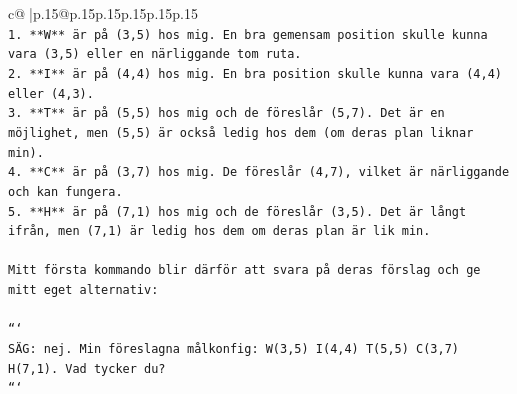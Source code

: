 \documentclass{article}
\begin{document}
{\begin{supertabular}{c@{$\;$}|p{.15\linewidth}@{}p{.15\linewidth}p{.15\linewidth}p{.15\linewidth}p{.15\linewidth}p{.15\linewidth}}
{{{\\ 
\texttt{1. **W** är på (3,5) hos mig. En bra gemensam position skulle kunna vara (3,5) eller en närliggande tom ruta.} \\
\texttt{2. **I** är på (4,4) hos mig. En bra position skulle kunna vara (4,4) eller (4,3).} \\
\texttt{3. **T** är på (5,5) hos mig och de föreslår (5,7). Det är en möjlighet, men (5,5) är också ledig hos dem (om deras plan liknar min).} \\
\texttt{4. **C** är på (3,7) hos mig. De föreslår (4,7), vilket är närliggande och kan fungera.} \\
\texttt{5. **H** är på (7,1) hos mig och de föreslår (3,5). Det är långt ifrån, men (7,1) är ledig hos dem om deras plan är lik min.} \\
\\ 
\texttt{Mitt första kommando blir därför att svara på deras förslag och ge mitt eget alternativ:} \\
\\ 
\texttt{```} \\
\texttt{SÄG: nej. Min föreslagna målkonfig: W(3,5) I(4,4) T(5,5) C(3,7) H(7,1). Vad tycker du?} \\
\texttt{```} \\
            }
        }
    }
     \\ \\


\end{supertabular}}
\end{document}
